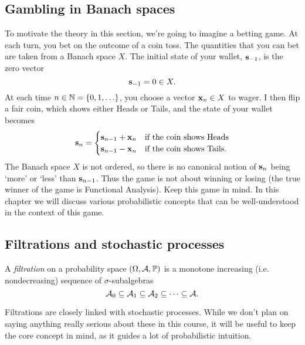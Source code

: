 \subsection{Gambling in Banach spaces}\label{sec:gambling}

To motivate the theory in this section, we're going to imagine a betting game.
At each turn, you bet on the outcome of a coin toss.
The quantities that you can bet are taken from a Banach space $X$.
The initial state of your wallet, $\mathbf{s}_{-1}$, is the zero vector
\begin{equation*}
  \mathbf{s}_{-1} = 0 \in X.
\end{equation*}
At each time $n \in \mathbb{N} = \{0,1,\ldots\}$, you choose a vector $\mathbf{x}_n \in X$ to wager.
I then flip a fair coin, which shows either Heads or Tails, and the state of your wallet becomes
\begin{equation*}
  \mathbf{s}_n =
  \begin{cases}
    \mathbf{s}_{n-1} + \mathbf{x}_n & \text{if the coin shows Heads} \\
    \mathbf{s}_{n-1} - \mathbf{x}_n & \text{if the coin shows Tails.}
  \end{cases}
\end{equation*}
The Banach space $X$ is not ordered, so there is no canonical notion of $\mathbf{s}_n$ being `more' or `less' than $\mathbf{s}_{n-1}$. Thus the game is not about winning or losing (the true winner of the game is Functional Analysis).
Keep this game in mind.
In this chapter we will discuss various probabilistic concepts that can be well-understood in the context of this game.


\subsection{Filtrations and stochastic processes}

\begin{defn}
  A \emph{filtration} on a probability space $(\Omega,\mathcal{A},\mathbb{P})$ is a monotone increasing (i.e. nondecreasing) sequence of $\sigma$-subalgebras
  \begin{equation*}
    \mathcal{A}_0 \subseteq \mathcal{A}_1 \subseteq \mathcal{A}_2 \subseteq \cdots \subseteq \mathcal{A}.
  \end{equation*}
\end{defn}

Filtrations are closely linked with stochastic processes.
While we don't plan on saying anything really serious about these in this course, it will be useful to keep the core concept in mind, as it guides a lot of probabilistic intuition.


